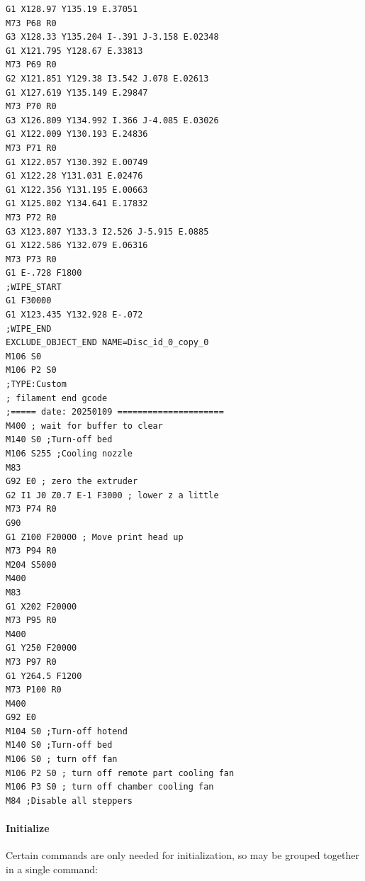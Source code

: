 \documentclass{ltxdoc}
\begin{document}
\begin{verbatim}
G1 X128.97 Y135.19 E.37051
M73 P68 R0
G3 X128.33 Y135.204 I-.391 J-3.158 E.02348
G1 X121.795 Y128.67 E.33813
M73 P69 R0
G2 X121.851 Y129.38 I3.542 J.078 E.02613
G1 X127.619 Y135.149 E.29847
M73 P70 R0
G3 X126.809 Y134.992 I.366 J-4.085 E.03026
G1 X122.009 Y130.193 E.24836
M73 P71 R0
G1 X122.057 Y130.392 E.00749
G1 X122.28 Y131.031 E.02476
G1 X122.356 Y131.195 E.00663
G1 X125.802 Y134.641 E.17832
M73 P72 R0
G3 X123.807 Y133.3 I2.526 J-5.915 E.0885
G1 X122.586 Y132.079 E.06316
M73 P73 R0
G1 E-.728 F1800
;WIPE_START
G1 F30000
G1 X123.435 Y132.928 E-.072
;WIPE_END
EXCLUDE_OBJECT_END NAME=Disc_id_0_copy_0
M106 S0
M106 P2 S0
;TYPE:Custom
; filament end gcode 
;===== date: 20250109 =====================
M400 ; wait for buffer to clear
M140 S0 ;Turn-off bed
M106 S255 ;Cooling nozzle
M83
G92 E0 ; zero the extruder
G2 I1 J0 Z0.7 E-1 F3000 ; lower z a little
M73 P74 R0
G90
G1 Z100 F20000 ; Move print head up 
M73 P94 R0
M204 S5000
M400
M83
G1 X202 F20000
M73 P95 R0
M400
G1 Y250 F20000
M73 P97 R0
G1 Y264.5 F1200
M73 P100 R0
M400
G92 E0
M104 S0 ;Turn-off hotend
M140 S0 ;Turn-off bed
M106 S0 ; turn off fan
M106 P2 S0 ; turn off remote part cooling fan
M106 P3 S0 ; turn off chamber cooling fan
M84 ;Disable all steppers

\end{verbatim}

\paragraph{Initialize}

Certain commands are only needed for initialization, so may be grouped together in a single command:
\end{document}
